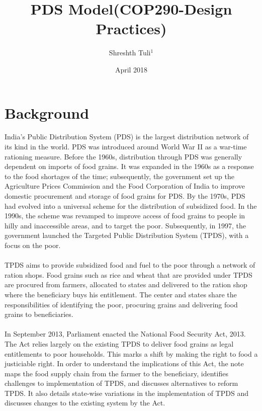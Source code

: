 \documentclass{article}
\title{PDS Model(COP290-Design Practices)}
\author{Shreshth Tuli$^{1}$}
\date{April 2018}
\begin{document}
\maketitle

\section{Background}
India's Public Distribution System (PDS) is the largest distribution network of its kind in the world.  PDS was introduced around World War II as a war-time rationing measure.  Before the 1960s, distribution through PDS was generally dependent on imports of food grains.  It was expanded in the 1960s as a response to the food shortages of the time; subsequently, the government set up the Agriculture Prices Commission and the Food Corporation of India  to improve domestic procurement and storage of food grains for PDS.  By the 1970s, PDS had evolved into a universal scheme for the distribution of subsidized food.  In the 1990s, the scheme was revamped to improve access of food grains to people in hilly and inaccessible areas, and to target the poor.   Subsequently, in 1997, the government launched the Targeted Public Distribution System (TPDS), with a focus on the poor. \\ \\ TPDS aims to provide subsidized food and fuel to the poor through a network of ration shops.  Food grains such as rice and wheat that are provided under TPDS are procured from farmers, allocated to states and delivered to the ration shop where the beneficiary buys his entitlement.  The center and states share the responsibilities of identifying the poor, procuring grains and delivering food grains to beneficiaries. \\ \\ In September 2013, Parliament enacted the National Food Security Act, 2013.  The Act relies largely on the existing TPDS to deliver food grains as legal entitlements to poor households.  This marks a shift by making the right to food a justiciable right.  In order to understand the implications of this Act, the note maps the food supply chain from the farmer to the beneficiary, identifies challenges to implementation of TPDS, and discusses alternatives to reform TPDS.  It also details state-wise variations in the implementation of TPDS and discusses changes to the existing system by the Act. 

\end{document}
